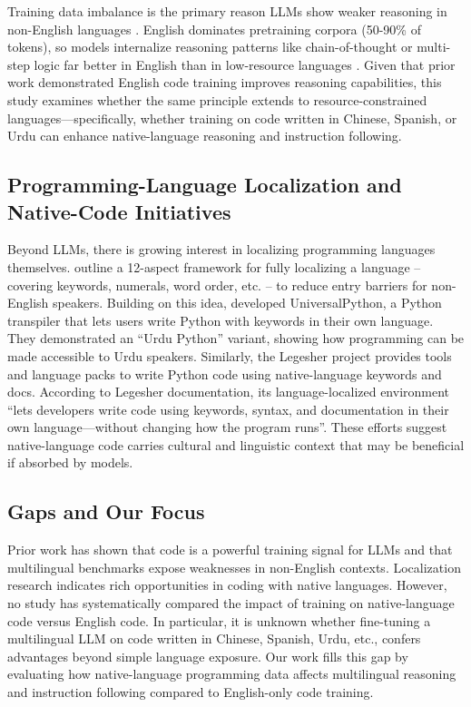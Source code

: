 \documentclass[conference]{IEEEtran}
\begin{document}
Training data imbalance is the primary reason LLMs show weaker reasoning in non-English languages \cite{huang2024mindmerger}. English dominates pretraining corpora (50-90\% of tokens), so models internalize reasoning patterns like chain-of-thought or multi-step logic far better in English than in low-resource languages \cite{rohera2025better}. Given that prior work \cite{code_or_not} demonstrated English code training improves reasoning capabilities, this study examines whether the same principle extends to resource-constrained languages—specifically, whether training on code written in Chinese, Spanish, or Urdu can enhance native-language reasoning and instruction following.

\subsection{Programming-Language Localization and Native-Code Initiatives}
Beyond LLMs, there is growing interest in localizing programming languages themselves. \citeauthor{localization_framework} outline a 12-aspect framework for fully localizing a language – covering keywords, numerals, word order, etc. – to reduce entry barriers for non-English speakers. Building on this idea, \citeauthor{multilingual_pl} developed UniversalPython, a Python transpiler that lets users write Python with keywords in their own language. They demonstrated an “Urdu Python” variant, showing how programming can be made accessible to Urdu speakers. Similarly, the Legesher project \cite{Edgar_Legesher_Because_language_2026} provides tools and language packs to write Python code using native-language keywords and docs. According to Legesher documentation, its language-localized environment “lets developers write code using keywords, syntax, and documentation in their own language—without changing how the program runs”. These efforts suggest native-language code carries cultural and linguistic context that may be beneficial if absorbed by models.  

\subsection{Gaps and Our Focus}
Prior work has shown that code is a powerful training signal for LLMs and that multilingual benchmarks expose weaknesses in non-English contexts. Localization research indicates rich opportunities in coding with native languages. However, no study has systematically compared the impact of training on native-language code versus English code. In particular, it is unknown whether fine-tuning a multilingual LLM on code written in Chinese, Spanish, Urdu, etc., confers advantages beyond simple language exposure. Our work fills this gap by evaluating how native-language programming data affects multilingual reasoning and instruction following compared to English-only code training.  
\end{document}
